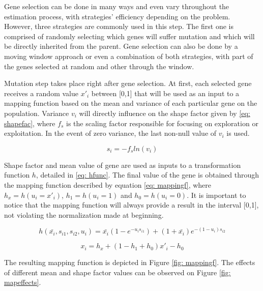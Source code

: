 Gene selection can be done in many ways and even vary throughout the estimation process, with strategies' efficiency depending on the problem. However, three strategies are commonly used in this step. The first one is comprised of randomly selecting which genes will suffer mutation and which will be directly inherited from the parent. Gene selection can also be done by a moving window approach or even a combination of both strategies, with part of the genes selected at random and other through the window.

Mutation step takes place right after gene selection. At first, each selected gene receives a random value $x'_{i}$ between [0,1] that will be used as an input to a mapping function based on the mean and variance of each particular gene on the population. Variance $v_{i}$ will directly influence on the shape factor given by \eqref{eq: shapefac}, where $f_{s}$ is the scaling factor responsible for focusing on exploration or exploitation. In the event of zero variance, the last non-null value of $v_{i}$ is used.

\begin{equation}
	s_{i} = -f_{s}ln(v_{i})
	\label{eq: shapefac}
\end{equation}

Shape factor and mean value of gene are used as inputs to a transformation function $h$, detailed in \eqref{eq: hfunc}. The final value of the gene is obtained through the mapping function described by equation \eqref{eq: mappingf}, where $h_{x} = h(u_{i} = x'_{i})$, $h_{1} = h(u_{i} = 1)$ and $h_{0} = h(u_{i} = 0)$. It is important to notice that the mapping function will always provide a result in the interval [0,1], not violating the normalization made at beginning.

\begin{equation}
	h(\bar{x_{i}}, s_{i1}, s_{i2}, u_{i}) = \bar{x_{i}}(1 - e^{-u_{i}s_{i1}}) + (1 + \bar{x_{i}})e^{-(1 - u_{i})s_{i2}}
	\label{eq: hfunc}
\end{equation}

\begin{equation}
	x_{i} = h_{x} + (1 - h_{1} + h_{0})x'_{i} - h_{0}
	\label{eq: mappingf}
\end{equation}

The resulting mapping function is depicted in Figure \ref{fig: mappingf}. The effects of different mean and shape factor values can be observed on Figure \ref{fig: mapeffects}.

